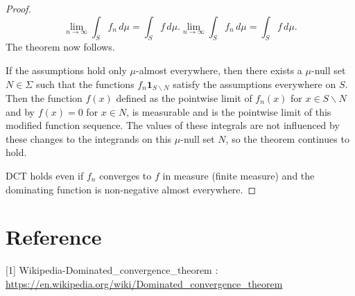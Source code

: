 \documentclass{article}
\begin{document}
\begin{proof}
$${\displaystyle \lim _{n\to \infty }\int _{S}f_{n}\,d\mu =\int _{S}f\,d\mu .}{\displaystyle \lim _{n\to \infty }\int _{S}f_{n}\,d\mu =\int _{S}f\,d\mu .}$$
The theorem now follows.

If the assumptions hold only $\mu$-almost everywhere, then there exists a $\mu$-null set $N \in \Sigma$ such that the functions $f_n \mathbf{1}_{S \backslash N}$ satisfy the assumptions everywhere on $S$. Then the function $f(x)$ defined as the pointwise limit of $f_n(x)$ for $x \in S \backslash N$ and by $f(x) = 0$ for $x \in N$, is measurable and is the pointwise limit of this modified function sequence. The values of these integrals are not influenced by these changes to the integrands on this $\mu$-null set $N$, so the theorem continues to hold.

DCT holds even if $f_n$ converges to $f$ in measure (finite measure) and the dominating function is non-negative almost everywhere.
\end{proof}

\section{Reference}
[1] Wikipedia-Dominated\_convergence\_theorem : \url{https://en.wikipedia.org/wiki/Dominated_convergence_theorem}
\end{document}
